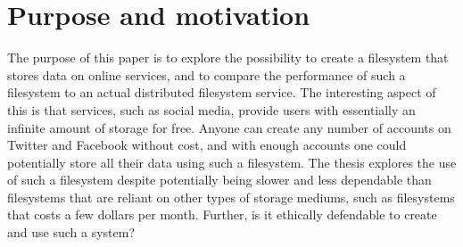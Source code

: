 
\section{Purpose and motivation}

The purpose of this paper is to explore the possibility to create a filesystem that stores data on online services, and to compare the performance of such a filesystem to an actual distributed filesystem service. The interesting aspect of this is that services, such as social media, provide users with essentially an infinite amount of storage for free. Anyone can create any number of accounts on Twitter and Facebook without cost, and with enough accounts one could potentially store all their data using such a filesystem. The thesis explores the use of such a filesystem despite potentially being slower and less dependable than filesystems that are reliant on other types of storage mediums, such as filesystems that costs a few dollars per month. Further, is it ethically defendable to create and use such a system?

